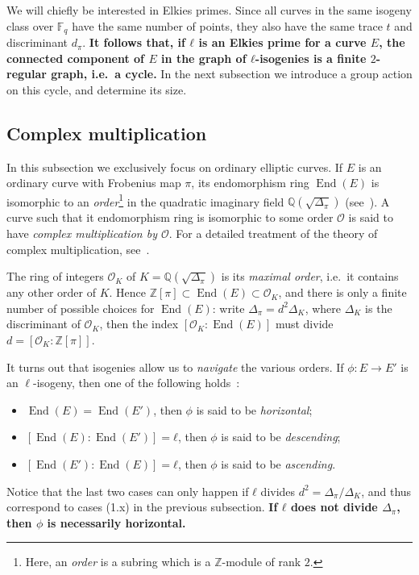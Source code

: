 \documentclass{article}
\newcommand{\F}{\mathbb{F}}
\renewcommand{\O}{\mathcal{O}}
\theoremstyle{definition}
\DeclareMathOperator{\End}{End}
\begin{document}
We will chiefly be interested in Elkies primes. Since all curves in
the same isogeny class over $\F_q$ have the same number of points,
they also have the same trace $t$ and discriminant $d_π$.
\textbf{It follows that, if $ℓ$ is an Elkies prime for a curve $E$,
  the connected component of $E$ in the graph of $ℓ$-isogenies is a
  finite $2$-regular graph, i.e.\ a cycle.} In the next subsection we
introduce a group action on this cycle, and determine its size.


\subsection{Complex multiplication}

In this subsection we exclusively focus on ordinary elliptic
curves. If $E$ is an ordinary curve with Frobenius map $π$, its
endomorphism ring $\End(E)$ is isomorphic to an
\emph{order}\footnote{Here, an \emph{order} is a subring which is a
  $ℤ$-module of rank $2$.} in the quadratic imaginary field
$ℚ(\sqrt{Δ_π})$ (see~\cite[III.9]{silverman:elliptic}).  A curve such
that it endomorphism ring is isomorphic to some order $\O$ is said to
have \emph{complex multiplication by $\O$}.  For a detailed treatment
of the theory of complex multiplication,
see~\cite{lang1987elliptic,silverman:advanced}.

The ring of integers $\O_K$ of $K=ℚ(\sqrt{Δ_π})$ is its
\emph{maximal order}, i.e.\ it contains any other order of $K$.  Hence
$ℤ[π]⊂\End(E)⊂\O_K$, and there is only a finite number of possible
choices for $\End(E)$: write $Δ_π=d^2Δ_K$, where $Δ_K$ is the
discriminant of $\O_K$, then the index $[\O_K:\End(E)]$ must divide
$d=[\O_K:ℤ[π]]$.

It turns out that isogenies allow us to \emph{navigate} the various
orders. If $ϕ:E→E'$ is an $\ell$-isogeny, then one of the following
holds~\cite[Prop.~21]{kohel}:
\begin{itemize}
\item $\End(E) = \End(E')$, then $ϕ$ is said to be
  \emph{horizontal};
\item $[\End(E):\End(E')] = ℓ$, then $ϕ$ is said to be
  \emph{descending};
\item $[\End(E'):\End(E)] = ℓ$, then $ϕ$ is said to be
  \emph{ascending}.
\end{itemize}
Notice that the last two cases can only happen if $ℓ$ divides
$d^2=Δ_π/Δ_K$, and thus correspond to cases (1.x) in the previous
subsection.
\textbf{If $ℓ$ does not divide $Δ_π$, then $ϕ$ is necessarily
  horizontal.}
\end{document}
